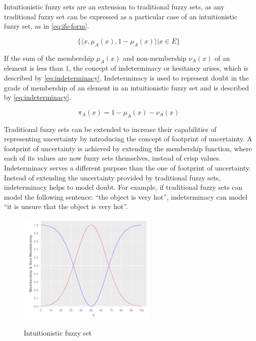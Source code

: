 \documentclass[review]{elsarticle}
\begin{document}
Intuitionistic fuzzy sets are an extension to traditional fuzzy sets, as any
traditional fuzzy set can be expressed as a particular case of an intuitionistic
fuzzy set, as in \ref{eq:ifs-form}.

\begin{equation}
  \label{eq:ifs-form}
  \{ \langle x, \mu_{A}(x), 1 - \mu_{A}(x) \rangle | x \in E \}
\end{equation}

If the sum of the membership $\mu_{A}(x)$ and non-membership $\nu_{A}(x)$ of an
element is less than $1$, the concept of indeterminacy or hesitancy arises,
which is described by \ref{eq:indeterminacy}. Indeterminacy is used to represent
doubt in the grade of membership of an element in an intuitionistic fuzzy set
and is described by \ref{eq:indeterminacy}.

\begin{equation}
  \label{eq:indeterminacy}
  \pi_{A}(x) = 1 - \mu_{A}(x) - \nu_{A}(x)
\end{equation}

Traditional fuzzy sets can be extended to increase their capabilities of
representing uncertainty by introducing the concept of footprint of
uncertainty. A footprint of uncertainty is achieved by extending the membership
function, where each of its values are now fuzzy sets themselves, instead of
crisp values. Indeterminacy serves a different purpose than the one of footprint
of uncertainty. Instead of extending the uncertainty provided by traditional
fuzzy sets, indeterminacy helps to model doubt. For example, if traditional
fuzzy sets can model the following sentence: ``the object is very hot'',
indeterminacy can model ``it is unsure that the object is very hot''.

\begin{figure}
\caption{Intuitionistic fuzzy set}
\centering
\includegraphics[width=0.6\textwidth]{img/fs-as-ifs.pdf}
\label{figure:agent-based-model}
\end{figure}
\end{document}
